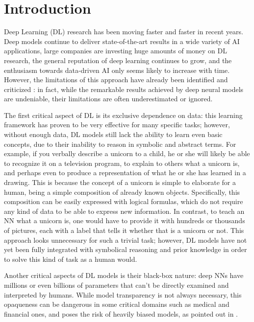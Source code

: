 \chapter{Introduction}
\label{introduction}

Deep Learning (DL) research has been moving faster and faster in recent years. Deep models continue to deliver state-of-the-art results in a wide variety of AI applications, large companies are investing huge amounts of money on DL research, the general reputation of deep learning continues to grow, and the enthusiasm towards data-driven AI only seems likely to increase with time. However, the limitations of this approach have already been identified and criticized \cite{marcus2018appraisal}: in fact, while the remarkable results achieved by deep neural models are undeniable, their limitations are often underestimated or ignored.

The first critical aspect of DL is its exclusive dependence on data: this learning framework has proven to be very effective for many specific tasks; however, without enough data, DL models still lack the ability to learn even basic concepts, due to their inability to reason in symbolic and abstract terms. For example, if you verbally describe a unicorn to a child, he or she will likely be able to recognize it on a television program, to explain to others what a unicorn is, and perhaps even to produce a representation of what he or she has learned in a drawing. This is because the concept of a unicorn is simple to elaborate for a human, being a simple composition of already known objects. Specifically, this composition can be easily expressed with logical formulas, which do not require any kind of data to be able to express new information.
In contrast, to teach an NN what a unicorn is, one would have to provide it with hundreds or thousands of pictures, each with a label that tells it whether that is a unicorn or not. This approach looks unnecessary for such a trivial task; however, DL models have not yet been fully integrated with symbolical reasoning and prior knowledge in order to solve this kind of task as a human would. 

Another critical aspects of DL models is their black-box nature: deep NNs have millions or even billions of parameters that can't be directly examined and interpreted by humans.
While model transparency is not always necessary, this opaqueness can be dangerous in some critical domains such as medical and financial ones, and poses the risk of heavily biased models, as pointed out in \cite{o2016weapons}.

